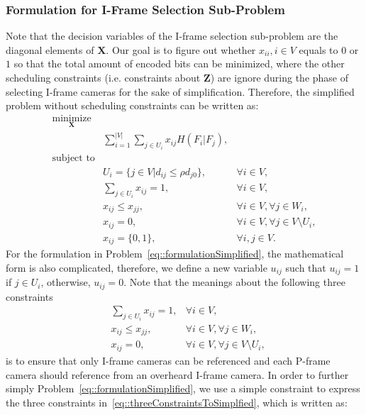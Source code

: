 \subsubsection{Formulation for I-Frame Selection Sub-Problem}
\label{sec::iFrameSelectionSubProbFormulation}
Note that the decision variables of the I-frame selection sub-problem are the diagonal elements of $\mathbf{X}$.
Our goal is to figure out whether ${x_{ii},i \in V}$ equals to $0$ or $1$ so that the total amount of encoded bits can be minimized, where the other scheduling constraints (i.e. constraints about $\mathbf{Z}$) are ignore during the phase of selecting I-frame cameras for the sake of simplification.
Therefore, the simplified problem without scheduling constraints can be written as:
\begin{align}
\underset{\mathbf{X}}{\text{minimize}} & & \nonumber \\
	&\sum_{i=1}^{|V|} \sum_{j \in U_i}  x_{ij} H(F_i|F_j), & \nonumber \\
\text{subject to} & & \nonumber \\
	&U_i = \{ j \in V | d_{ij} \leq \rho d_{j0} \}, &\forall i \in V, \nonumber \\
	&\sum_{j \in U_i} x_{ij} = 1, &\forall i \in V, \nonumber \\
	&x_{ij} \leq x_{jj}, &\forall i \in V, \forall j \in W_i, \nonumber \\
	&x_{ij} = 0, &\forall i \in V, \forall j \in V \setminus U_i, \nonumber \\
	&x_{ij} = \{0,1\}, &\forall i,j \in V.
\label{eq::formulationSimplified}
\end{align}
For the formulation in Problem~\eqref{eq::formulationSimplified}, the mathematical form is also complicated, therefore, we define a new variable $u_{ij}$ such that $u_{ij} = 1$ if $j \in U_i$, otherwise, $u_{ij} = 0$.
Note that the meanings about the following three constraints
\begin{align}
&\sum_{j \in U_i} x_{ij} = 1, &\forall i \in V, \nonumber \\
&x_{ij} \leq x_{jj}, &\forall i \in V, \forall j \in W_i, \nonumber \\
&x_{ij} = 0, &\forall i \in V, \forall j \in V \setminus U_i,
\label{eq::threeConstraintsToSimplfied}
\end{align}
is to ensure that only I-frame cameras can be referenced and each P-frame camera should reference from an overheard I-frame camera.
In order to further simply Problem~\eqref{eq::formulationSimplified}, we use a simple constraint to express the three constraints in~\eqref{eq::threeConstraintsToSimplfied}, which is written as:
